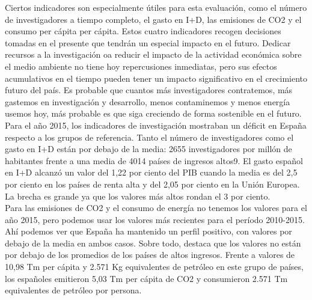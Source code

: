     Ciertos indicadores son especialmente útiles para esta evaluación, como el número de investigadores a tiempo completo, el gasto en I+D, las emisiones de CO2 y el consumo per cápita per cápita. Estos cuatro indicadores recogen decisiones tomadas en el presente que tendrán un especial impacto en el futuro. Dedicar recursos a la investigación oa reducir el impacto de la actividad económica sobre el medio ambiente no tiene hoy repercusiones inmediatas, pero sus efectos acumulativos en el tiempo pueden tener un impacto significativo en el crecimiento futuro del país. Es probable que cuantos más investigadores contratemos, más gastemos en investigación y desarrollo, menos contaminemos y menos energía usemos hoy, más probable es que siga creciendo de forma sostenible en el futuro.\\
    Para el año 2015, los indicadores de investigación mostraban un déficit en España respecto a los grupos de referencia. Tanto el número de investigadores como el gasto en I+D están por debajo de la media: 2655 investigadores por millón de habitantes frente a una media de 4014 países de ingresos altos9. El gasto español en I+D alcanzó un valor del 1,22 por ciento del PIB cuando la media es del 2,5 por ciento en los países de renta alta y del 2,05 por ciento en la Unión Europea. La brecha es grande ya que los valores más altos rondan el 3 por ciento.\\
    Para las emisiones de CO2 y el consumo de energía no tenemos los valores para el año 2015, pero podemos usar los valores más recientes para el período 2010-2015. Ahí podemos ver que España ha mantenido un perfil positivo, con valores por debajo de la media en ambos casos. Sobre todo, destaca que los valores no están por debajo de los promedios de los países de altos ingresos. Frente a valores de 10,98 Tm per cápita y 2.571 Kg equivalentes de petróleo en este grupo de países, los españoles emitieron 5,03 Tm per cápita de CO2 y consumieron 2.571 Tm equivalentes de petróleo por persona.

